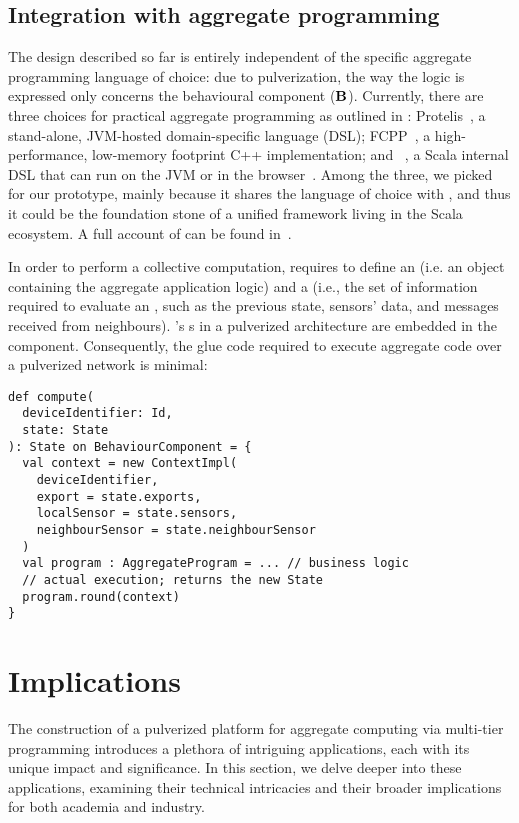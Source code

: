 \subsection{Integration with aggregate programming}
\label{scafiloci}

The design described so far is entirely independent of the specific aggregate programming language of choice:
due to pulverization, the way the logic is expressed only concerns the behavioural component ($\mathbf{B}$).
%
Currently, there are three choices for practical aggregate programming as outlined in :
Protelis~\cite{PianiniSAC2015}, a stand-alone, JVM-hosted domain-specific language (DSL);
FCPP~\cite{DBLP:conf/acsos/Audrito20}, a high-performance, low-memory footprint C++ implementation;
and \scafi{}~\cite{DBLP:conf/isola/CasadeiVAD20}, a Scala internal DSL that can run on the JVM or in the browser~\cite{DBLP:conf/coordination/AguzziCMPV21}.
%
Among the three, we picked \scafi{} for our prototype,
mainly because it shares the language of choice with \scalaloci{},
and thus it could be the foundation stone of a unified framework living in the Scala ecosystem.  A full account of \scafi{} can be found in~.

In order to perform a collective computation, \scafi{} requires to define an  (i.e. an object containing the aggregate application logic) and 
a  (i.e., the set of information required to evaluate an , such as the previous state, sensors' data, and messages received from neighbours).
%
\scafi{}'s s in a pulverized architecture are embedded in the  component.
%
Consequently, the glue code required to execute \scafi{} aggregate code over a pulverized network is minimal:
\begin{verbatim}
def compute(
  deviceIdentifier: Id,
  state: State
): State on BehaviourComponent = {
  val context = new ContextImpl(
    deviceIdentifier,
    export = state.exports,
    localSensor = state.sensors,
    neighbourSensor = state.neighbourSensor
  )
  val program : AggregateProgram = ... // business logic
  // actual execution; returns the new State
  program.round(context)
}
\end{verbatim}
\section{Implications}
\label{implicitation}
The construction of a pulverized platform for aggregate computing via multi-tier programming introduces a plethora of intriguing applications, 
 each with its unique impact and significance. 
 In this section, we delve deeper into these applications, 
 examining their technical intricacies and their broader implications for both academia and industry.

